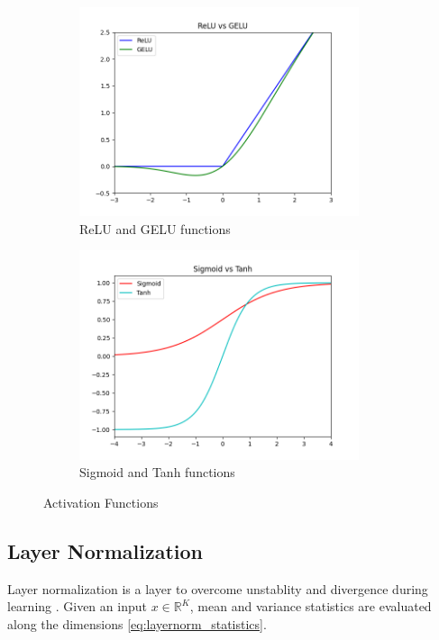 \begin{figure}
	\begin{subfigure}{.5\textwidth}
		\centering
		\includegraphics[width=0.9\textwidth]{figures/ml_theory/relu_gelu.png}
		\caption{ReLU and GELU functions}
		\label{fig:relu_gelu}
	\end{subfigure}
	\begin{subfigure}{.5\textwidth}
		\centering
		\includegraphics[width=0.9\textwidth]{figures/ml_theory/sigmoid_tanh.png}
		\caption{Sigmoid and Tanh functions}
		\label{fig:sigmoid_tanh}
	\end{subfigure}
	\caption{Activation Functions}
	\label{fig:activation_functions}
\end{figure}

\subsection{Layer Normalization}
Layer normalization is a layer to overcome unstablity and divergence during learning \cite{ba_layer_2016}. Given an input $x \in \mathbb{R}^K$, mean and variance statistics are evaluated along the dimensions \eqref{eq:layernorm_statistics}.

